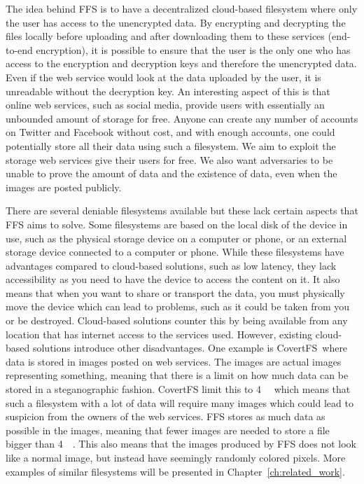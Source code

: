 The idea behind \gls{FFS} is to have a decentralized \mbox{cloud-based} filesystem where only the user has access to the unencrypted data. By encrypting and decrypting the files locally before uploading and after downloading them to these services (\mbox{end-to-end} encryption), it is possible to ensure that the user is the only one who has access to the encryption and decryption keys and therefore the unencrypted data. Even if the web service would look at the data uploaded by the user, it is unreadable without the decryption key. An interesting aspect of this is that online web services, such as social media, provide users with essentially an unbounded amount of storage for free. Anyone can create any number of accounts on Twitter and Facebook without cost, and with enough accounts, one could potentially store all their data using such a filesystem. We aim to exploit the storage web services give their users for free. We also want adversaries to be unable to prove the amount of data and the existence of data, even when the images are posted publicly.

There are several deniable filesystems available but these lack certain aspects that \gls{FFS} aims to solve. Some filesystems are based on the local disk of the device in use, such as the physical storage device on a computer or phone, or an external storage device connected to a computer or phone. While these filesystems have advantages compared to \mbox{cloud-based} solutions, such as low latency, they lack accessibility as you need to have the device to access the content on it. It also means that when you want to share or transport the data, you must physically move the device which can lead to problems, such as it could be taken from you or be destroyed. \mbox{Cloud-based} solutions counter this by being available from any location that has internet access to the services used. However, existing \mbox{cloud-based} solutions introduce other disadvantages. One example is CovertFS\,\cite{baliga2007web} where data is stored in images posted on web services. The images are actual images representing something, meaning that there is a limit on how much data can be stored in a steganographic fashion. CovertFS limit this to \SI{4}{\kilo\byte} which means that such a filesystem with a lot of data will require many images which could lead to suspicion from the owners of the web services. \gls{FFS} stores as much data as possible in the images, meaning that fewer images are needed to store a file bigger than \SI{4}{\kilo\byte}. This also means that the images produced by \gls{FFS} does not look like a normal image, but instead have seemingly randomly colored pixels. More examples of similar filesystems will be presented in Chapter~\ref{ch:related_work}. 